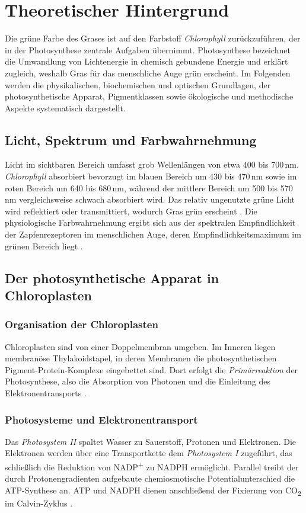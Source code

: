 \chapter{Theoretischer Hintergrund}

Die grüne Farbe des Grases ist auf den Farbstoff \textit{Chlorophyll} zurückzuführen, der in der Photosynthese zentrale Aufgaben übernimmt. Photosynthese bezeichnet die Umwandlung von Lichtenergie in chemisch gebundene Energie und erklärt zugleich, weshalb Gras für das menschliche Auge grün erscheint. Im Folgenden werden die physikalischen, biochemischen und optischen Grundlagen, der photosynthetische Apparat, Pigmentklassen sowie ökologische und methodische Aspekte systematisch dargestellt.

\section{Licht, Spektrum und Farbwahrnehmung}

Licht im sichtbaren Bereich umfasst grob Wellenlängen von etwa 400 bis 700\,nm. \textit{Chlorophyll} absorbiert bevorzugt im blauen Bereich um 430 bis 470\,nm sowie im roten Bereich um 640 bis 680\,nm, während der mittlere Bereich um 500 bis 570\,nm vergleichsweise schwach absorbiert wird. Das relativ ungenutzte grüne Licht wird reflektiert oder transmittiert, wodurch Gras grün erscheint \parencite{meyer2018photosynthese}. Die physiologische Farbwahrnehmung ergibt sich aus der spektralen Empfindlichkeit der Zapfenrezeptoren im menschlichen Auge, deren Empfindlichkeitsmaximum im grünen Bereich liegt \parencite{renoult2017evolution}.

\section{Der photosynthetische Apparat in Chloroplasten}

\subsection{Organisation der Chloroplasten}
Chloroplasten sind von einer Doppelmembran umgeben. Im Inneren liegen membranöse Thylakoidstapel, in deren Membranen die photosynthetischen Pigment-Protein-Komplexe eingebettet sind. Dort erfolgt die \textit{Primärreaktion} der Photosynthese, also die Absorption von Photonen und die Einleitung des Elektronentransports \parencite{meyer2018photosynthese}.

\subsection{Photosysteme und Elektronentransport}
Das \textit{Photosystem II} spaltet Wasser zu Sauerstoff, Protonen und Elektronen. Die Elektronen werden über eine Transportkette dem \textit{Photosystem I} zugeführt, das schließlich die Reduktion von NADP\textsuperscript{+} zu NADPH ermöglicht. Parallel treibt der durch Protonengradienten aufgebaute chemiosmotische Potentialunterschied die ATP-Synthese an. ATP und NADPH dienen anschließend der Fixierung von CO\textsubscript{2} im Calvin-Zyklus \parencite{zhao2012chlorophyll}.

